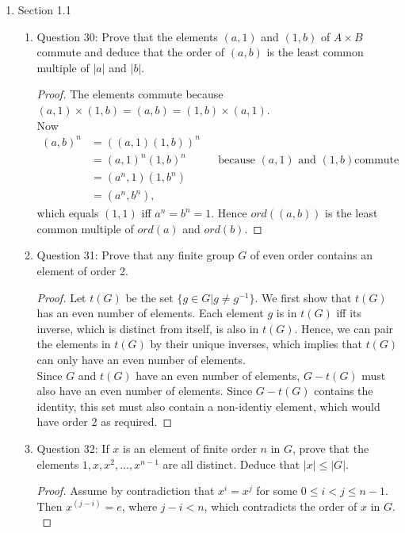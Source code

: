 \documentclass{article}
\newcommand{\TODO}[1]{\textcolor{red}{TODO: #1}}
\begin{document}
\begin{enumerate}
\begin{enumerate}
\begin{proof}
          \TODO{Compare groups.}
        \end{proof}
    \end{enumerate}

  \item Section 1.1
    \begin{enumerate}
      \item Question 30: Prove that the elements $(a,1)$ and $(1,b)$ of
        $A\times B$ commute and deduce that the order of $(a,b)$ is the
        least common multiple of $|a|$ and $|b|$.
        \begin{proof}
          The elements commute because
          $(a,1)\times(1,b)=(a,b)=(1,b)\times(a,1)$. \\

          Now
          \begin{align*}
            (a,b)^n & = ((a,1)(1,b))^n && \\
                    & = (a,1)^n(1,b)^n && \text{because $(a,1)$ and $(1,b)$
                    commute} \\
                    & = (a^n,1)(1,b^n) && \\
                    & = (a^n,b^n),     &&
          \end{align*}
          which equals $(1,1)$ iff $a^n=b^n=1$. Hence $ord((a,b))$ is the
          least common multiple of $ord(a)$ and $ord(b)$.
        \end{proof}
      \item Question 31: Prove that any finite group $G$ of even order
        contains an element of order 2.
        \begin{proof}
          Let $t(G)$ be the set $\{g\in G | g \neq g^{-1}\}$. We first show
          that $t(G)$ has an even number of elements. Each element $g$ is
          in $t(G)$ iff its inverse, which is distinct from itself, is also
          in $t(G)$. Hence, we can pair the elements in $t(G)$ by their
          unique inverses, which implies that $t(G)$ can only have an even
          number of elements. \\

          Since $G$ and $t(G)$ have an even number of elements, $G-t(G)$
          must also have an even number of elements. Since $G-t(G)$
          contains the identity, this set must also contain a non-identiy
          element, which would have order 2 as required.
        \end{proof}
      \item Question 32: If $x$ is an element of finite order $n$ in $G$,
        prove that the elements $1,x,x^2,\ldots,x^{n-1}$ are all distinct.
        Deduce that $|x|\leq |G|$.
        \begin{proof}
          Assume by contradiction that $x^i=x^j$ for some $0\leq i<j \leq
          n-1$. Then $x^{(j-i)}=e$, where $j-i<n$, which contradicts the
          order of $x$ in $G$. \\


\end{proof}
\end{enumerate}
\end{enumerate}
\end{document}
